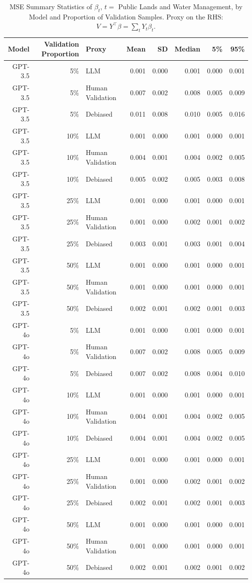 \begin{table}

\caption{MSE Summary Statistics of $\beta_{t}$, $t=$ Public Lands and Water Management, by Model and Proportion of Validation Samples.
      Proxy on the RHS: $V = Y^\top \beta = \sum_{t} Y_t \beta_t$.}
\centering
\begin{tabular}[t]{rrlrrrrr}
\toprule
Model & Validation Proportion & Proxy & Mean & SD & Median & 5\% & 95\%\\
\midrule
GPT-3.5 & 5\% & LLM & 0.001 & 0.000 & 0.001 & 0.000 & 0.001\\
GPT-3.5 & 5\% & Human Validation & 0.007 & 0.002 & 0.008 & 0.005 & 0.009\\
GPT-3.5 & 5\% & Debiased & 0.011 & 0.008 & 0.010 & 0.005 & 0.016\\
GPT-3.5 & 10\% & LLM & 0.001 & 0.000 & 0.001 & 0.000 & 0.001\\
GPT-3.5 & 10\% & Human Validation & 0.004 & 0.001 & 0.004 & 0.002 & 0.005\\
GPT-3.5 & 10\% & Debiased & 0.005 & 0.002 & 0.005 & 0.003 & 0.008\\
GPT-3.5 & 25\% & LLM & 0.001 & 0.000 & 0.001 & 0.000 & 0.001\\
GPT-3.5 & 25\% & Human Validation & 0.001 & 0.000 & 0.002 & 0.001 & 0.002\\
GPT-3.5 & 25\% & Debiased & 0.003 & 0.001 & 0.003 & 0.001 & 0.004\\
GPT-3.5 & 50\% & LLM & 0.001 & 0.000 & 0.001 & 0.000 & 0.001\\
GPT-3.5 & 50\% & Human Validation & 0.001 & 0.000 & 0.001 & 0.000 & 0.001\\
GPT-3.5 & 50\% & Debiased & 0.002 & 0.001 & 0.002 & 0.001 & 0.003\\
GPT-4o & 5\% & LLM & 0.001 & 0.000 & 0.001 & 0.000 & 0.001\\
GPT-4o & 5\% & Human Validation & 0.007 & 0.002 & 0.008 & 0.005 & 0.009\\
GPT-4o & 5\% & Debiased & 0.007 & 0.002 & 0.008 & 0.004 & 0.010\\
GPT-4o & 10\% & LLM & 0.001 & 0.000 & 0.001 & 0.000 & 0.001\\
GPT-4o & 10\% & Human Validation & 0.004 & 0.001 & 0.004 & 0.002 & 0.005\\
GPT-4o & 10\% & Debiased & 0.004 & 0.001 & 0.004 & 0.002 & 0.005\\
GPT-4o & 25\% & LLM & 0.001 & 0.000 & 0.001 & 0.000 & 0.001\\
GPT-4o & 25\% & Human Validation & 0.001 & 0.000 & 0.002 & 0.001 & 0.002\\
GPT-4o & 25\% & Debiased & 0.002 & 0.001 & 0.002 & 0.001 & 0.003\\
GPT-4o & 50\% & LLM & 0.001 & 0.000 & 0.001 & 0.000 & 0.001\\
GPT-4o & 50\% & Human Validation & 0.001 & 0.000 & 0.001 & 0.000 & 0.001\\
GPT-4o & 50\% & Debiased & 0.002 & 0.001 & 0.002 & 0.001 & 0.002\\
\bottomrule
\end{tabular}
\end{table}
